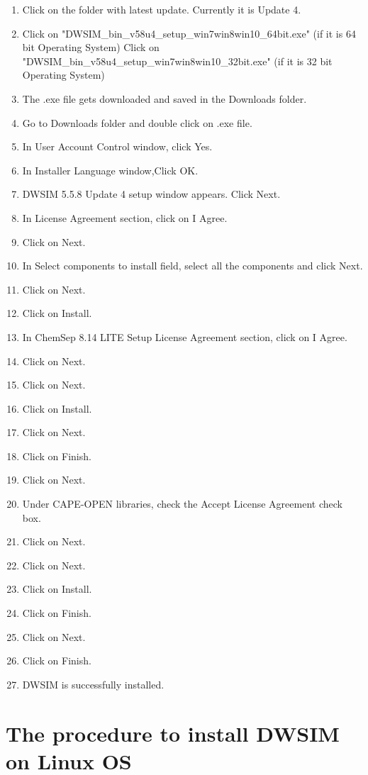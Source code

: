 \documentclass[12pt,a4paper]{article}
\begin{document}
\begin{enumerate}
\item Click on the folder with latest update. Currently it is Update 4.
\item Click on "DWSIM\_bin\_v58u4\_setup\_win7win8win10\_64bit.exe" (if it is 64 bit Operating System)
\newline Click on "DWSIM\_bin\_v58u4\_setup\_win7win8win10\_32bit.exe" (if it is 32 bit Operating System)
\item The .exe file gets downloaded and saved in the Downloads folder.
\item Go to Downloads folder and double click on .exe file.
\item In User Account Control window, click Yes.
\item In Installer Language window,Click OK.
\item DWSIM 5.5.8 Update 4 setup window appears. Click Next.
\item In License Agreement section, click on I Agree.
\item Click on Next.
\item In Select components to install field, select all the components and click Next.
\item Click on Next.
\item Click on Install.
\item In ChemSep 8.14 LITE Setup License Agreement section, click on I Agree.
\item Click on Next.
\item Click on Next.
\item Click on Install.
\item Click on Next.
\item Click on Finish.
\item Click on Next.
\item Under CAPE-OPEN libraries, check the Accept License Agreement check box.
\item Click on Next.
\item Click on Next.
\item Click on Install.
\item Click on Finish.
\item Click on Next.
\item Click on Finish.
\item DWSIM is successfully installed.

\end{enumerate}

\section{The procedure to install DWSIM on Linux OS}
\end{document}
